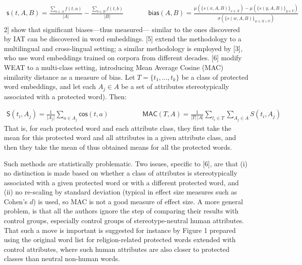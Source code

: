 \documentclass[
  12pt,
  dvipsnames,enabledeprecatedfontcommands]{scrartcl}
\begin{document}
\footnotesize \begin{align}
\mathsf{s}(t,A,B)  = \frac{\sum_{a\in A}f(t,a)}{\vert A\vert} - \frac{\sum_{b\in B}f(t,b)}{\vert B\vert}
& \,\,\,\,\,\,\,\,\,\,\,\,\,\,\,\,\,
\mathsf{bias}(A,B)  = \frac{
\mu(\{s(x,A,B)\}_{x\in X}) -\mu(\{s(y,A,B)\}_{y\in Y}) 
}{
\sigma(\{s(w,A,B)\}_{w\in X\cup Y})
} \tag{WEAT}
\end{align} \normalsize \noindent {[}2{]} show that significant
biases---thus measured--- similar to the ones discovered by IAT can be
discovered in word embeddings. {[}5{]} extend the methodology to a
multilingual and cross-lingual setting; a similar methodology is
employed by {[}3{]}, who use word embeddings trained on corpora from
different decades. {[}6{]} modify WEAT to a multi-class setting,
introducing Mean Average Cosine (MAC) similarity distance as a measure
of bias. Let \(T = \{t_1, \dots, t_k\}\) be a class of protected word
embeddings, and let each \(A_j\in A\) be a set of attributes
stereotypically associated with a protected word). Then:

\vspace{-2mm}

\footnotesize

\begin{align}
\mathsf{S}(t_i, A_j)  = \frac{1}{\vert A_j\vert}\sum_{a\in A_j}\mathsf{cos}(t,a) & \,\,\,\,\,\,\,\,\,\,\,\,\,\,\,\,\,\,\,\,\,\,\,\,\,
\mathsf{MAC}(T,A)  = \frac{1}{\vert T \vert \,\vert A\vert}\sum_{t_i \in T }\sum_{A_j \in A} S(t_i,A_j) \tag{MAC}
\end{align} \normalsize  \noindent That is, for each protected word and
each attribute class, they first take the mean for this protected word
and all attributes in a given attribute class, and then they take the
mean of thus obtained means for all the protected words.

Such methods are statistically problematic. Two issues, specific to
{[}6{]}, are that (i) no distinction is made based on whether a class of
attributes is stereotypically associated with a given protected word or
with a different protected word, and (ii) no re-scaling by standard
deviation (typical in effect size measures such as Cohen's \(d\)) is
used, so MAC is not a good measure of effect size. A more general
problem, is that all the authors ignore the step of comparing their
results with control groups, especially control groups of
stereotype-neutral human attributes. That such a move is important is
suggested for instance by Figure 1 prepared using the original word list
for religion-related protected words extended with control attributes,
where such human attributes are also closer to protected classes than
neutral non-human words.
\end{document}
